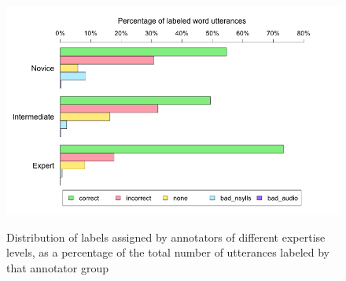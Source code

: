 			\begin{figure}[tb]
				\centering
				\caption[Distribution of labels by annotator expertise]{Distribution of labels assigned by annotators of different expertise levels,
				as a percentage of the total number of utterances labeled by that annotator group
				}
				\includegraphics[width=\textwidth]{img/plots/pctJudgmentsByExpertise-notStacked}
				\label{fig:agreement:expertisebars}
			\end{figure}			
			
			
			
%				
			
